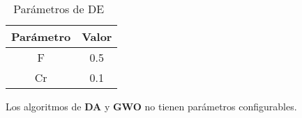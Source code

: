 \begin{table}[H]
    \centering
    \begin{tabular}{ c c }
        \hline
        \textbf{Parámetro} & \textbf{Valor} \\
        \hline
        F                  & 0.5            \\
        Cr                 & 0.1            \\
        \hline
    \end{tabular}
    \caption{Parámetros de DE~\cite{storn_differential_1997}}
\end{table}

Los algoritmos de \textbf{DA} y \textbf{GWO} no tienen parámetros configurables.